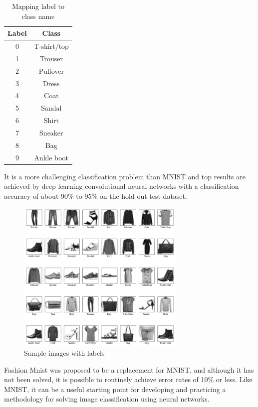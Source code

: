 \documentclass[14pt, a4paper]{article}
\numberwithin{equation}{section}
\numberwithin{algorithm}{section}
\numberwithin{figure}{section}
\begin{document}
\begin{table} [h!]
  \centering
  \begin{tabular}{ || c | c  || }
  \hline
  Label & Class \\ [0.5 ex]
  \hline \hline
  0 & T-shirt/top \\ \hline
  1 & Trouser \\ \hline
  2 & Pullover \\ \hline
  3 & Dress \\ \hline
  4 & Coat \\ \hline
  5 & Sandal\\ \hline
  6 & Shirt\\ \hline 
  7 & Sneaker \\ \hline
  8 & Bag \\ \hline
  9 & Ankle boot \\ [1ex]
  \hline
  \end{tabular}
  \caption{Mapping label to class name}
\end{table}

It is a more challenging classification problem than MNIST and top results are achieved by deep learning convolutional neural networks with a classification accuracy of about 90\% to 95\% on the hold out test dataset.

\begin{figure}[h!]
  \centering
  \includegraphics[width=8cm]{sample_images_with_labels.png}
  \caption{Sample images with labels}
\end{figure}

Fashion Mnist was proposed to be a replacement for MNIST, and although it has not been solved, it is possible to routinely achieve error rates of 10\% or less. 
Like MNIST, it can be a useful starting point for developing and practicing a methodology for solving image classification using neural networks.
\end{document}
